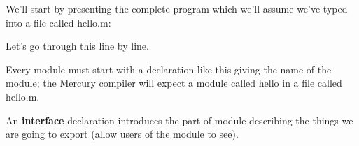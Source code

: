\documentclass[a4paper,11pt,notitlepage,onecolumn]{book}
\begin{document}
We'll start by presenting the complete program which we'll assume we've
typed into a file called \textsf{hello.m}:
\begin{small}

\begin{ptabular}
\nextline
{}
\nextline
{}
\nextline
{}
\nextline
{}
\nextline
{}
\nextline
{}
\nextline
\end{ptabular}

\end{small}
Let's go through this line by line.
\begin{small}

\begin{ptabular}
\nextline
\end{ptabular}

\end{small}
Every module must start with a declaration like this giving the name of the
module; the Mercury compiler will expect a module called \textsf{hello} in
a file called \textsf{hello.m}.
\begin{small}

\begin{ptabular}
\nextline
\end{ptabular}

\end{small}
An \textsf{\textbf{interface}} declaration introduces the part of module describing the
things we are going to export (\ie allow users of the module to see).
\begin{small}

\begin{ptabular}
\nextline
\end{ptabular}

\end{small}
\end{document}

